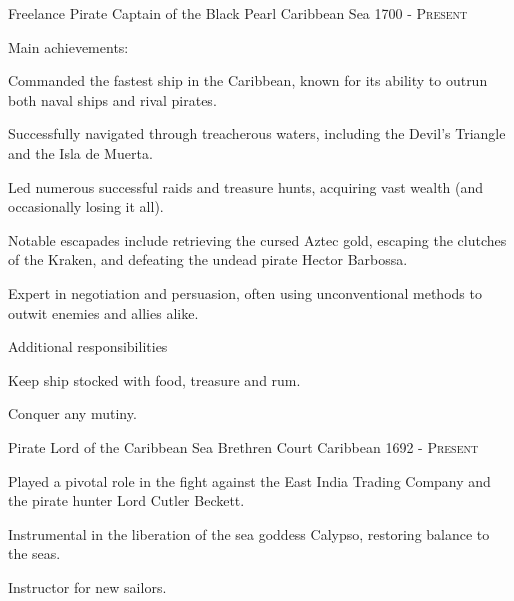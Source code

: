 


\begin{cventries}


\cventry
{Freelance Pirate} %
{Captain of the Black Pearl} %
{Caribbean Sea} %
{1700 - \textsc{Present}} %
{
\begin{cvitems}
\setlength{\itemsep}{1ex} %
% 
\item Main achievements:
\begin{cvitemsnested}
    \item{Commanded the fastest ship in the Caribbean, known for its ability to outrun both naval ships and rival pirates.}
    \item{Successfully navigated through treacherous waters, including the Devil's Triangle and the Isla de Muerta.}
    \item{Led numerous successful raids and treasure hunts, acquiring vast wealth (and occasionally losing it all).}
    \item{Notable escapades include retrieving the cursed Aztec gold, escaping the clutches of the Kraken, and defeating the undead pirate Hector Barbossa.}
    \item{Expert in negotiation and persuasion, often using unconventional methods to outwit enemies and allies alike.}
\end{cvitemsnested}
\item Additional responsibilities
    \begin{cvitemsnested}
    \item {Keep ship stocked with food, treasure and rum.}
    \item {Conquer any mutiny.}
    \end{cvitemsnested}
\end{cvitems}
}

\cventry
{Pirate Lord of the Caribbean Sea} %
{Brethren Court} %
{Caribbean } %
{1692 - \textsc{Present}} %
{
\begin{cvitems}
\setlength{\itemsep}{1ex} %
%
\item {Played a pivotal role in the fight against the East India Trading Company and the pirate hunter Lord Cutler Beckett. \hfill {}}
\item {Instrumental in the liberation of the sea goddess Calypso, restoring balance to the seas. \hfill {}}
\item {Instructor for new sailors.}
\end{cvitems}
}


\end{cventries}
